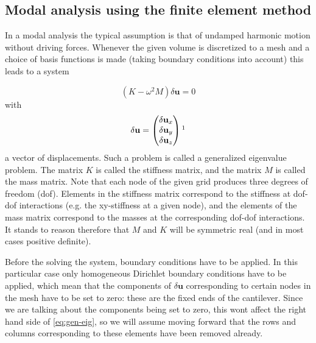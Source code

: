 \documentclass{article}
\begin{document}
\subsection{Modal analysis using the finite element method}
In a modal analysis the typical assumption is that of undamped harmonic motion without driving
forces. Whenever the given volume is discretized to a mesh and a choice of basis functions is made
(taking boundary conditions into account) this leads to a system

\begin{equation}\label{eq:gen-eig}
	(K - \omega^2 M)\delta \mathbf{u} = 0
\end{equation}
with
$$\delta \mathbf{u}=\begin{pmatrix}
	\delta \mathbf{u}_x\\
	\delta \mathbf{u}_y\\
	\delta \mathbf{u}_z
\end{pmatrix}\footnotemark$$
a vector of displacements. Such a problem is called a generalized eigenvalue problem. The matrix $K$
is called the stiffness matrix, and the matrix $M$ is called the mass matrix. Note that each node of the
given grid produces three degrees of freedom (dof). Elements in the stiffness matrix correspond to the
stiffness at dof-dof interactions (e.g. the xy-stiffness at a given node), and the elements of the mass
matrix correspond to the masses at the corresponding dof-dof interactions. 
It stands to reason therefore that $M$ and $K$ will be symmetric real (and in most cases positive definite).

Before the solving the system, boundary conditions have to be applied. In this particular case only homogeneous Dirichlet boundary conditions have to be applied, which mean that the components of $\delta \textbf{u}$ corresponding to certain nodes in the mesh have to be set to zero: these are the fixed ends of the cantilever. Since we are talking about the components being set to zero, this wont affect the right hand side of \autoref{eq:gen-eig}, so we will assume moving forward that the rows and columns corresponding to these elements have been removed already.
\end{document}
